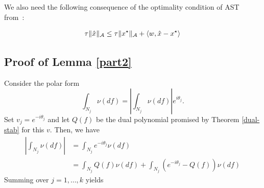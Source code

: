We also need the following consequence of the optimality condition of AST from~\cite[Lemma 2]{btr12}:
\begin{prop}\label{pro:optimality}
\begin{align}
\tau \lVert\hat{x}\rVert_{\mathcal{A}} \leq \tau \lVert x^\star\rVert_{\mathcal{A}} + \langle w, \hat{x} - x^\star \rangle
\end{align}
\end{prop}

\subsection{Proof of Lemma \ref{part2}}\label{apx:pf:I0I1}
Consider the polar form
\[
  \int_{N_j} \nu ( df)  =  \left| \int_{N_j} \nu ( df) \right| e^{i \theta_j} .
\]
Set $v_j = e^{-i \theta_j}$ and let $Q(f)$ be the dual polynomial promised by Theorem \ref{dual-stab} for this $v$. Then, we have 
\begin{align*}
  \left| \int_{N_j} \nu ( d f) \right| & = 
  \int_{N_j} e^{- i \theta_j} \nu ( d f)\\
  & =  \int_{N_j} Q ( f) \nu ( d f) + 
  \int_{N_j} (e^{- i \theta_j} -  Q ( f) ) \nu ( d f)
\end{align*}
Summing over $j=1,\ldots,k$ yields

